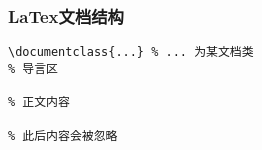\begin{frame}[fragile]
\frametitle{LaTex文档结构}

\begin{lstlisting}
\documentclass{...} % ... 为某文档类
% 导言区

% 正文内容

% 此后内容会被忽略
\end{lstlisting}

\end{frame}
